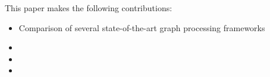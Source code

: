 






This paper makes the following contributions:
\begin{itemize}
  \item Comparison of several state-of-the-art graph processing frameworks
  \item 
  \item
  \item
\end{itemize}
